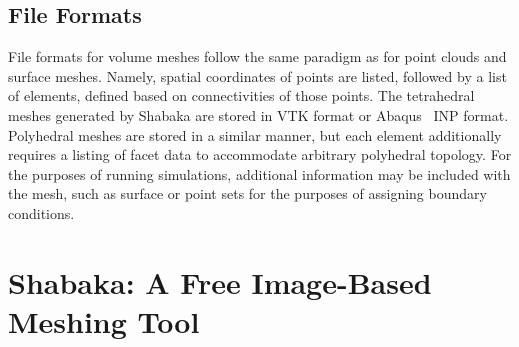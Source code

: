 \subsection{File Formats}
\label{File Formats-MESH}
File formats for volume meshes follow the same paradigm as for point clouds and surface meshes. Namely, spatial coordinates of points are listed, followed by a list of elements, defined based on connectivities of those points. The tetrahedral meshes generated by Shabaka are stored in VTK format or Abaqus~\cite{abaqus} INP format. Polyhedral meshes are stored in a similar manner, but each element additionally requires a listing of facet data to accommodate arbitrary polyhedral topology. For the purposes of running simulations, additional information may be included with the mesh, such as surface or point sets for the purposes of assigning boundary conditions.

\section{Shabaka: A Free Image-Based Meshing Tool}

